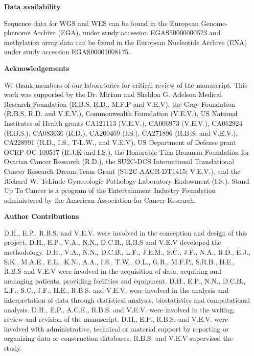 \noindent \textbf{Data availability}

\noindent Sequence data for WGS and WES can be found in the European Genome-phenome Archive (EGA), under study accession EGAS50000000523 and methylation array data can be found in the European Nucleotide Archive (ENA) under study accession EGAS00001008175.

\vspace{1em}
\noindent \textbf{Acknowledgements}

\noindent We thank members of our laboratories for critical review of the manuscript.
This work was supported by the Dr. Miriam and Sheldon G. Adelson Medical Research Foundation (R.B.S, R.D., M.F.P and V.E.V), the Gray Foundation (R.B.S, R.D. and V.E.V.), Commonwealth Foundation (V.E.V.), US National Institutes of Health grants CA121113 (V.E.V.), CA006973 (V.E.V.), CA062924 (R.B.S.), CA083636 (R.D.), CA200469 (I.S.), CA271896 (R.B.S. and V.E.V.), CA228991 (R.D., I.S., T-L.W., and V.E.V), US Department of Defense grant OCRP-OC-100517 (R.J.K and I.S.), the Honorable Tina Brozman Foundation for Ovarian Cancer Research (R.D.), the SU2C-DCS International Translational Cancer Research Dream Team Grant (SU2C-AACR-DT1415; V.E.V.), and the Richard W. TeLinde Gynecologic Pathology Laboratory Endowment (I.S.).
Stand Up To Cancer is a program of the Entertainment Industry Foundation administered by the American Association for Cancer Research.

\vspace{1em}
\noindent \textbf{Author Contributions}

\noindent D.H., E.P., R.B.S. and V.E.V. were involved in the conception and design of this project. D.H., E.P., V.A., N.N., D.C.B., R.B.S and V.E.V developed the methodology. D.H., V.A., N.N., D.C.B., L.F., J.E.M., S.C., J.F., N.A., R.D., E.J., S.K., M.A.E., E.L., K.N., A.A., I.S., T.W., O.L., G.R., M.F.P., S.R.B., H.E., R.B.S and V.E.V were involved in the acquisition of data, acquiring and managing patients, providing facilities and equipment.
D.H., E.P., N.N., D.C.B., L.F., S.C., J.F., H.E., R.B.S. and V.E.V. were involved in the analysis and interpretation of data through statistical analysis, biostatistics and computational analysis.
D.H., E.P., A.C.E., R.B.S. and V.E.V. were involved in the writing, review and revision of the manuscript.
D.H., E.P., R.B.S. and V.E.V. were involved with administrative, technical or material support by reporting or organizing data or construction databases.
R.B.S. and V.E.V supervised the study.

